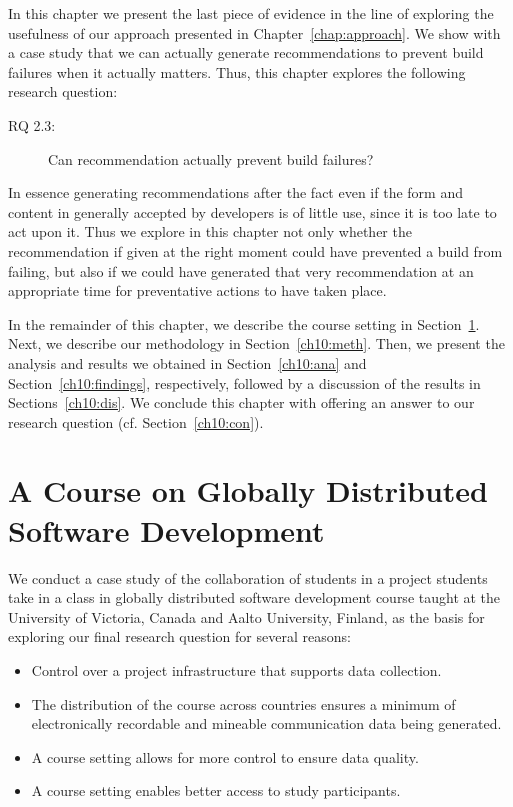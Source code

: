 \label{chap:actionable}
In this chapter we present the last piece of evidence in the line of exploring the usefulness of our approach presented in Chapter~\ref{chap:approach}.
We show with a case study that we can actually generate recommendations to prevent build failures when it actually matters.
Thus, this chapter explores the following research question:

\begin{description}
  \item[RQ 2.3:] Can recommendation actually prevent build failures?
\end{description}

In essence generating recommendations after the fact even if the form and content in generally accepted by developers is of little use, since it is too late to act upon it.
Thus we explore in this chapter not only whether the recommendation if given at the right moment could have prevented a build from failing, but also if we could have generated that very recommendation at an appropriate time for preventative actions to have taken place.

In the remainder of this chapter, %
we describe the course setting in Section~\ref{ch10:setting}.
Next, we describe our methodology in Section~\ref{ch10:meth}.
Then, we present the analysis and results we obtained in Section~\ref{ch10:ana} and Section~\ref{ch10:findings}, respectively, followed by a discussion of the results in Sections~\ref{ch10:dis}.
We conclude this chapter with offering an answer to our research question (cf. Section~\ref{ch10:con}).


\section{A Course on Globally Distributed Software Development}
\label{ch10:setting}
We conduct a case study of the collaboration of students in a project students take in a class in globally distributed software development course taught at the University of Victoria, Canada and Aalto University, Finland, as the basis for exploring our final research question for several reasons:
\begin{itemize}
\item Control over a project infrastructure that supports data collection.
\item The distribution of the course across countries ensures a minimum of electronically recordable and mineable communication data being generated.
\item A course setting allows for more control to ensure data quality.
\item A course setting enables better access to study participants.
\end{itemize}

